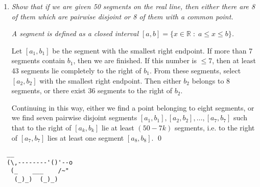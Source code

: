\documentclass{article}
\begin{document}
\begin{enumerate}
\vspace{12pt}
\item %
\textit{Show that if we are given 50 segments on the real line, then either there are 8 of them which are pairwise disjoint or 8 of them with a common point.}

\textit{A segment is defined as a closed interval $[a, b] = \{x \in \mathbb{R} \;:\; a \leq x \leq b \}$.}

Let $[a_1, b_1]$ be the segment with the smallest right endpoint. If more than 7 segments contain $b_1$, then we are finished. If this number is $\leq 7$, then at least 43 segments lie completely to the right of $b_1$. From these segments, select $[a_2, b_2]$ with the smallest right endpoint. Then either $b_2$ belongs to 8 segments, or there exist 36 segments to the right of $b_2$.

Continuing in this way, either we find a point belonging to eight segments, or we find seven pairwise disjoint segments $[a_1, b_1], [a_2, b_2], \dots, [a_7, b_7]$ such that to the right of $[a_k, b_k]$ lie at least $(50-7k)$ segments, i.e. to the right of $[a_7, b_7]$ lies at least one segment $[a_8, b_8]$. \qed 


\end{enumerate}


\vspace{12pt}
\begin{center}
\begin{BVerbatim}
  __
  (\,--------'()'--o
   (_    ___    /~"
    (_)_)  (_)_)
\end{BVerbatim}
\end{center}
\end{document}
